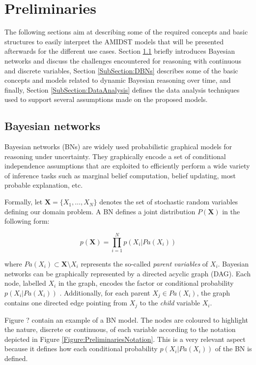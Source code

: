 \section{Preliminaries}\label{Section:Preliminaries}

The following sections aim at describing some of the required concepts and basic structures to easily interpret the AMIDST models that will be presented afterwards for the different use cases. Section \ref{SubSection:HybridBNs} briefly introduces Bayesian networks and discuss the challenges encountered for reasoning with continuous and discrete variables, Section \ref{SubSection:DBNs} describes some of the basic concepts and models related to dynamic Bayesian reasoning over time, and finally, Section \ref{SubSection:DataAnalysis} defines the data analysis techniques used to support several assumptions made on the proposed models.

\subsection{Bayesian networks}\label{SubSection:HybridBNs}

Bayesian networks (BNs) \cite{JensenNielsen2007} are widely used probabilistic graphical models for reasoning under uncertainty. They graphically encode a set of conditional independence assumptions that are exploited to efficiently perform a wide variety of inference tasks such as marginal belief computation, belief updating, most probable explanation, etc.  

Formally, let $\bm X = \{X_1,\ldots,X_N\}$ denotes the set of stochastic random variables defining our domain problem. A BN defines a joint distribution $P(\bm X)$ in the following form:

$$ p(\bm X) = \prod_{i=1}^N p(X_i|Pa(X_i))$$ 

\noindent where $Pa(X_i)\subset \bm X\setminus X_i$ represents the so-called \emph{parent variables} of $X_i$. Bayesian networks can be graphically represented by a directed acyclic graph (DAG). Each node, labelled $X_i$ in the graph, encodes the factor or conditional probability $p(X_i|Pa(X_i))$ . Additionally, for each parent $X_j \in Pa(X_i)$, the graph contains one directed edge pointing from $X_j$ to the \emph{child} variable $X_i$.

Figure ? contain an example of a BN model. The nodes are coloured to highlight the nature, discrete or continuous, of each variable according to the notation depicted in Figure \ref{Figure:PreliminariesNotation}. This is a very relevant aspect because it defines how each conditional probability $p(X_i|Pa(X_i))$ of the BN is defined. 

